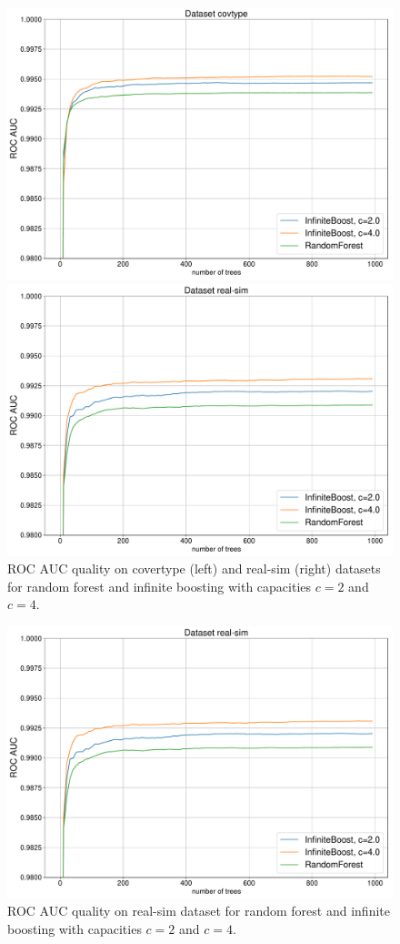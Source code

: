\ifarxiv
  \begin{figure}[!h]
    \centering
    \begin{multicols}{2}
      \includegraphics[width=1\linewidth]{../research/plots/forest_longrun_covtype.pdf}
      
      \includegraphics[width=1\linewidth]{../research/plots/forest_longrun_real-sim.pdf}
    \end{multicols}
    \caption{ROC AUC quality on covertype (left) and real-sim (right) datasets for random forest and infinite boosting with capacities $c=2$ and $c=4$. \label{fig:inf}}
  \end{figure}
\else
  \begin{figure}[!h]
    \centering
      \includegraphics[width=0.5\linewidth]{../research/plots/forest_longrun_real-sim.pdf}
      \caption{ROC AUC quality on real-sim dataset for random forest and infinite boosting with capacities $c=2$ and $c=4$. \label{fig:inf}}
  \end{figure}
\fi
